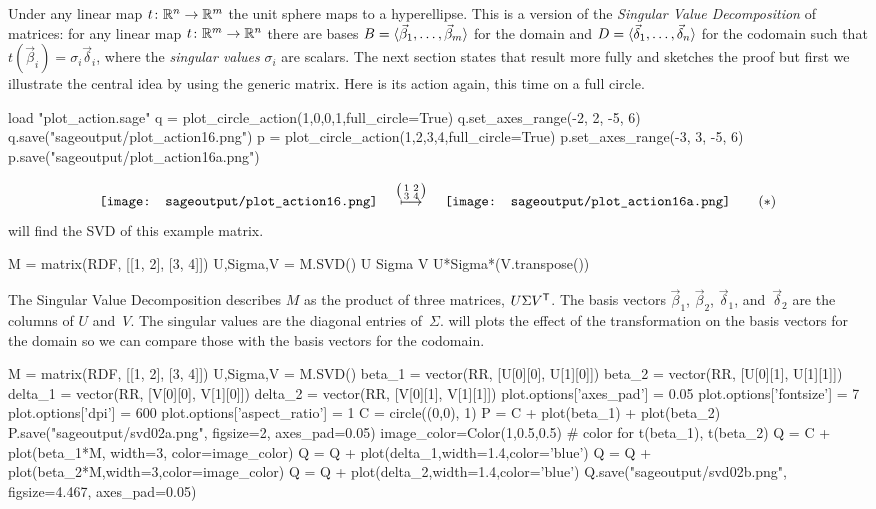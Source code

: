 Under any linear map $\mbox{$t\colon \mathbb{R}^n\to \mathbb{R}^m$}$ the 
unit sphere maps to a hyperellipse.
This is a version of the \textit{Singular Value Decomposition} of
matrices:
for any linear map $\mbox{$t\colon \mathbb{R}^m\to \mathbb{R}^n$}$ there are bases
$B=\langle\vec{\beta}_1,\ldots,\vec{\beta}_m\rangle$ for the domain and
$D=\langle\vec{\delta}_1,\ldots,\vec{\delta}_n\rangle$ for the codomain
such that $t(\vec{\beta}_i)=\sigma_i\vec{\delta}_i$, where the
\textit{singular values}
$\sigma_i$ are scalars.
The next section states that result more fully and sketches the proof
but first we illustrate the central idea by using the generic matrix.
Here is its action again, this time on a full circle.
\begin{sageoutput}[d,0,4;d,5,7]
load "plot_action.sage"
q = plot_circle_action(1,0,0,1,full_circle=True) 
q.set_axes_range(-2, 2, -5, 6) 
q.save("sageoutput/plot_action16.png")
p = plot_circle_action(1,2,3,4,full_circle=True) 
p.set_axes_range(-3, 3, -5, 6) 
p.save("sageoutput/plot_action16a.png")
\end{sageoutput}
\begin{equation*}
  \vcenteredhbox{\texttt{[image: sageoutput/plot\_action16.png]}}
  \quad\mapsunder{\big (\begin{smallmatrix} 1 &2 \\ 3 &4 \end{smallmatrix}\big )}\quad
  \vcenteredhbox{\texttt{[image: sageoutput/plot\_action16a.png]}}
  \tag{$*$}
\end{equation*}
\Sage{} will find the SVD of this example matrix.
\begin{sageoutput}
M = matrix(RDF, [[1, 2], [3, 4]])
U,Sigma,V = M.SVD()
U
Sigma
V
U*Sigma*(V.transpose())
\end{sageoutput}
\noindent 
The Singular Value Decomposition describes $M$ as the product of
three matrices, $U\Sigma{{V}^{\textsf{T}}}$.
The basis vectors $\vec{\beta}_1$, $\vec{\beta}_2$, $\vec{\delta}_1$, 
and~$\vec{\delta}_2$ are the columns of $U$ and~$V$. 
The singular values are the diagonal entries of~$\Sigma$.
\Sage{} will plots the effect of the transformation
on the basis vectors for the domain so we can compare those with the
basis vectors for the codomain.
\begin{sageoutput}[d,0,2]
M = matrix(RDF, [[1, 2], [3, 4]])
U,Sigma,V = M.SVD()
beta_1 = vector(RR, [U[0][0], U[1][0]])
beta_2 = vector(RR, [U[0][1], U[1][1]])
delta_1 = vector(RR, [V[0][0], V[1][0]])
delta_2 = vector(RR, [V[0][1], V[1][1]])
plot.options['axes_pad'] = 0.05
plot.options['fontsize'] = 7
plot.options['dpi'] = 600
plot.options['aspect_ratio'] = 1
C = circle((0,0), 1)
P = C + plot(beta_1) + plot(beta_2)
P.save("sageoutput/svd02a.png", figsize=2, axes_pad=0.05)
image_color=Color(1,0.5,0.5)   # color for t(beta_1), t(beta_2)
Q = C + plot(beta_1*M, width=3, color=image_color) 
Q = Q + plot(delta_1,width=1.4,color='blue') 
Q = Q + plot(beta_2*M,width=3,color=image_color) 
Q = Q + plot(delta_2,width=1.4,color='blue')
Q.save("sageoutput/svd02b.png", figsize=4.467, axes_pad=0.05)
\end{sageoutput}
